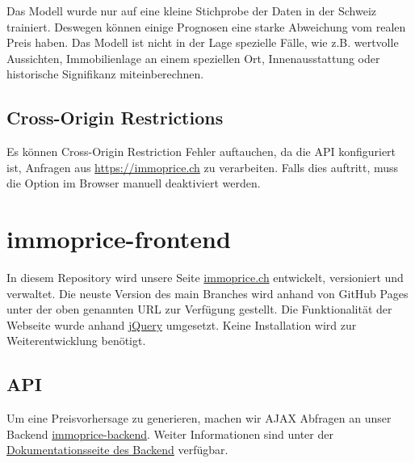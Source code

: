 \documentclass[a4paper, 12pt]{article}
\begin{document}
Das Modell wurde nur auf eine kleine Stichprobe der Daten in der Schweiz
trainiert. Deswegen können einige Prognosen eine starke Abweichung vom
realen Preis haben. Das Modell ist nicht in der Lage spezielle Fälle,
wie z.B. wertvolle Aussichten, Immobilienlage an einem speziellen Ort,
Innenausstattung oder historische Signifikanz miteinberechnen.

\hypertarget{cross-origin-restrictions}{%
\subsection{Cross-Origin
Restrictions}\label{cross-origin-restrictions}}

Es können Cross-Origin Restriction Fehler auftauchen, da die API
konfiguriert ist, Anfragen aus
\href{https://immoprice.ch}{https://immoprice.ch} zu verarbeiten. Falls
dies auftritt, muss die Option im Browser manuell deaktiviert werden.

\hypertarget{immoprice-frontend}{%
\section{immoprice-frontend}\label{immoprice-frontend}}

In diesem Repository wird unsere Seite
\href{https://immoprice.ch}{immoprice.ch} entwickelt, versioniert und
verwaltet. Die neuste Version des main Branches wird anhand von GitHub
Pages unter der oben genannten URL zur Verfügung gestellt. Die
Funktionalität der Webseite wurde anhand
\href{https://jquery.com}{jQuery} umgesetzt. Keine Installation wird zur
Weiterentwicklung benötigt.

\hypertarget{api}{%
\subsection{API}\label{api}}

Um eine Preisvorhersage zu generieren, machen wir AJAX Abfragen an unser
Backend
\href{https://github.com/Immobilienrechner-Challenge/immoprice-backend}{immoprice-backend}.
Weiter Informationen sind unter der
\href{https://github.com/Immobilienrechner-Challenge/docs/blob/main/Repositories/immoprice-backend/Dokumentation.md}{Dokumentationsseite
des Backend} verfügbar.
\end{document}
